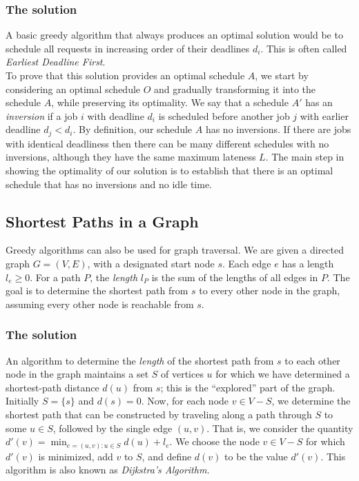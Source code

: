\documentclass[]{article}
\begin{document}
		\subsubsection{The solution}
			A basic greedy algorithm that always produces an optimal solution would be to schedule all requests in increasing order of their deadlines $d_i$. This is often called \emph{Earliest Deadline First}. \\
			
			To prove that this solution provides an optimal schedule $A$, we start by considering an optimal schedule $O$ and gradually transforming it into the schedule $A$, while preserving its optimality. We say that a schedule $A'$ has an \emph{inversion} if a job $i$ with deadline $d_i$ is scheduled before another job $j$ with earlier deadline $d_j < d_i$. By definition, our schedule $A$ has no inversions. If there are jobs with identical deadliness then there can be many different schedules with no inversions, although they have the same maximum lateness $L$. The main step in showing the optimality of our solution is to establish that there is an optimal schedule that has no inversions and no idle time.
	\subsection{Shortest Paths in a Graph}
		Greedy algorithms can also be used for graph traversal. We are given a directed graph $G = (V,E)$, with a designated start node $s$. Each edge $e$ has a length $l_e \ge 0$. For a path $P$, the \emph{length} $l_P$ is the sum of the lengths of all edges in $P$. The goal is to determine the shortest path from $s$ to every other node in the graph, assuming every other node is reachable from $s$. 
		
		\subsubsection{The solution}
			An algorithm to determine the \emph{length} of the shortest path from $s$ to each other node in the graph maintains a set $S$ of vertices $u$ for which we have determined a shortest-path distance $d(u)$ from $s$; this is the ``explored'' part of the graph. Initially $S = \{s\}$ and $d(s) = 0$. Now, for each node $v \in V - S$, we determine the shortest path that can be constructed by traveling along a path through $S$ to some $u \in S$, followed by the single edge $(u,v)$. That is, we consider the quantity $d'(v) = \min_{e=(u,v):u\in S}d(u) + l_e$. We choose the node $v \in V - S$ for which $d'(v)$ is minimized, add $v$ to $S$, and define $d(v)$ to be the value $d'(v)$. This algorithm is also known as \emph{Dijkstra's Algorithm.}\\
			
\end{document}
